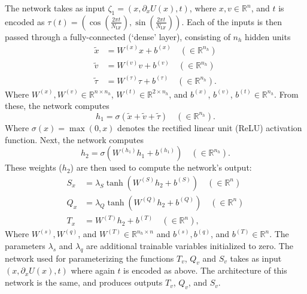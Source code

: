 The network takes as input $\zeta_1 = (x, \partial_{x} U(x), t)$, where $x, v
\in \mathbb{R}^{n}$, and $t$ is encoded as $\tau(t) = \left(\cos{(\frac{2\pi
t}{N_{\mathrm{LF}}})},\right.  \left.\sin{(\frac{2\pi
t}{N_{\mathrm{LF}}})}\right)$.
%
Each of the inputs is then passed through a fully-connected (`dense' layer),
consisting of $n_h$ hidden units
%
\begin{align}
    \tilde x &= W^{(x)} x + b^{(x)} \quad (\in \mathbb{R}^{n_h})\\
    \tilde v &= W^{(v)} v + b^{(v)} \quad (\in \mathbb{R}^{n_h})\\
    \tilde \tau &= W^{(\tau)} \tau + b^{(\tau)} \quad (\in \mathbb{R}^{n_h}).
\end{align}
%
Where $W^{(x)}, W^{(v)} \in \mathbb{R}^{n \times n_h}$, $W^{(t)} \in
\mathbb{R}^{2 \times n_h}$, and $b^{(x)}$, $b^{(v)}$,  $b^{(t)} \in
\mathbb{R}^{n_h}$.
%
From these, the network computes
%
\begin{equation}
    h_1 = \sigma(\tilde x + \tilde v + \tilde \tau) \quad (\in
    \mathbb{R}^{n_h}).
    \label{eq:hidden_1}
\end{equation}
%
Where $\sigma(x) = \max(0, x)$ denotes the rectified linear unit (ReLU)
activation function.
%
Next, the network computes
%
\begin{equation}
    h_2 = \sigma\left(W^{(h_1)} h_1 + b^{(h_1)}\right) \quad (\in
    \mathbb{R}^{n_h}).
    \label{eq:hidden_2}
\end{equation}
%
These weights ($h_2$) are then used to compute the network's output:
%
\begin{align}
    S_x &= \lambda_S \tanh(W^{(S)} h_2 + b^{(S)})\quad (\in \mathbb{R}^{n})\\
    Q_x &= \lambda_{Q} \tanh(W^{(Q)} h_2 + b^{(Q)})\quad (\in \mathbb{R}^{n})\\
    T_x &= W^{(T)} h_2 + b^{(T)}\quad (\in \mathbb{R}^{n}),
\end{align}
%
Where $W^{(s)}, W^{(q)}$, and $W^{(T)} \in \mathbb{R}^{n_h \times n}$ and
$b^{(s)}, b^{(q)}$, and $b^{(T)} \in \mathbb{R}^{n}$.
%
The parameters $\lambda_s$ and $\lambda_q$ are additional trainable variables
initialized to zero.
%
The network used for parameterizing the functions $T_v$, $Q_v$ and $S_v$ takes
as input $(x, \partial_x U(x), t)$ where again $t$ is encoded as above.  The
architecture of this network is the same, and produces outputs $T_v$, $Q_v$,
and $S_v$.


%
